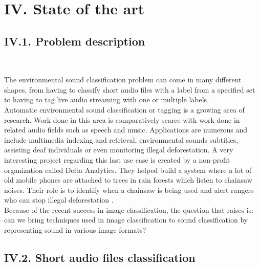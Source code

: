 \documentclass[11pt, a4papper]{report}
\theoremstyle{plain}
\theoremstyle{definition}
\theoremstyle{definition}
\theoremstyle{proposition}
\begin{document}

\chapter*{IV. State of the art}

\section*{IV.1. Problem description}
\

The environmental sound classification problem can come in many different shapes, from having to classify short audio files with a label from a specified set to having to tag live audio streaming with one or multiple labels.
\\

Automatic environmental sound classification or tagging is a growing area of research. Work done in this area is comparatively scarce with work done in related audio fields such as speech and music. Applications are numerous and include multimedia indexing and retrieval, environmental sounds subtitles, assisting deaf individuals or even monitoring illegal deforestation. A very interesting project regarding this last use case is created by a non-profit organization called Delta Analytics. They helped build a system where a lot of old mobile phones are attached to trees in rain forests which listen to chainsaw noises. Their role is to identify when a chainsaw is being used and alert rangers who can stop illegal deforestation \cite{13}.
\\

Because of the recent success in image classification, the question that raises is: can we bring techniques used in image classification to sound classification by representing sound in various image formats?

\section*{IV.2. Short audio files classification}

\end{document}
